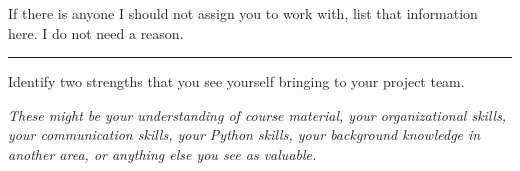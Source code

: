 \documentclass[12pt,letterpaper,noanswers]{exam}
\begin{document}
\noindent If there is anyone I should not assign you to work with, list that information here.  I do not need a reason.
\vspace{1.5cm}

\hrule
\vspace{0.2cm}
\noindent Identify two strengths that you see yourself bringing to your project team.

\emph{These might be your understanding of course material, your organizational skills, your communication skills, your Python skills, your background knowledge in another area, or anything else you see as valuable.}
\vspace{1in}

\end{document}
